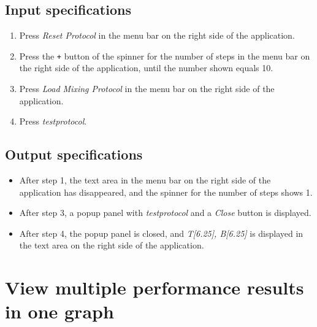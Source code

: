 \subsection*{Input specifications}
\begin{enumerate}
\item Press \emph{Reset Protocol} in the menu bar on the right side of the application.
\item Press the \texttt{+} button of the spinner for the number of steps in the menu bar on the right side of the application, until the number shown equals 10.
\item Press \emph{Load Mixing Protocol} in the menu bar on the right side of the application.
\item Press \emph{testprotocol}.
\end{enumerate}

\subsection*{Output specifications}
\begin{itemize}
\item After step 1, the text area in the menu bar on the right side of the application has disappeared, and the spinner for the number of steps shows 1.
\item After step 3, a popup panel with \emph{testprotocol} and a \emph{Close} button is displayed.
\item After step 4, the popup panel is closed, and \emph{T[6.25], B[6.25]} is displayed in the text area on the right side of the application.
\end{itemize}

\section{View multiple performance results in one graph}

